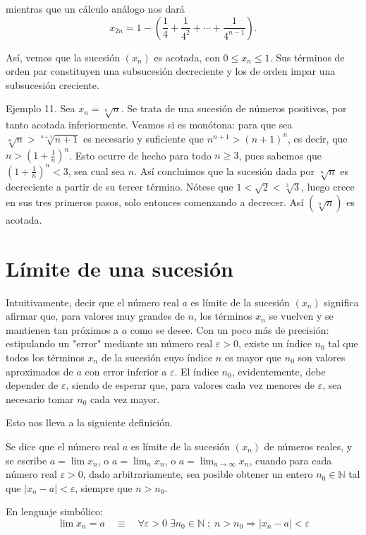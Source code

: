\documentclass[12pt,oneside]{book}
\begin{document}
mientras que un cálculo análogo nos dará
\[x_{2n} = 1 - \left(\frac{1}{4} + \frac{1}{4^2} + \cdots + \frac{1}{4^{n-1}}\right).\]

Así, vemos que la sucesión \((x_n)\) es acotada, con \(0 \le x_n \le 1\). Sus términos de orden par constituyen una subsucesión decreciente y los de orden impar una subsucesión creciente.

Ejemplo 11. Sea \(x_n = \sqrt[n]{n}\). Se trata de una sucesión de números positivos, por tanto acotada inferiormente. Veamos si es monótona: para que sea \(\sqrt[n]{n} > \sqrt[n+1]{n+1}\) es necesario y suficiente que \(n^{n+1} > (n+1)^n\), es decir, que \(n > \left(1 + \frac{1}{n}\right)^n\). Esto ocurre de hecho para todo \(n \ge 3\), pues sabemos que \(\left(1 + \frac{1}{n}\right)^n < 3\), sea cual sea \(n\). Así concluimos que la sucesión dada por \(\sqrt[n]{n}\) es decreciente a partir de su tercer término. Nótese que \(1 < \sqrt{2} < \sqrt[3]{3}\), luego crece en sus tres primeros pasos, solo entonces comenzando a decrecer. Así \((\sqrt[n]{n})\) es acotada.

\section{Límite de una sucesión}

Intuitivamente, decir que el número real \(a\) es límite de la sucesión \((x_n)\) significa afirmar que, para valores muy grandes de \(n\), los términos \(x_n\) se vuelven y se mantienen tan próximos a \(a\) como se desee. Con un poco más de precisión: estipulando un "error" mediante un número real \(\varepsilon > 0\), existe un índice \(n_0\) tal que todos los términos \(x_n\) de la sucesión cuyo índice \(n\) es mayor que \(n_0\) son valores aproximados de \(a\) con error inferior a \(\varepsilon\). El índice \(n_0\), evidentemente, debe depender de \(\varepsilon\), siendo de esperar que, para valores cada vez menores de \(\varepsilon\), sea necesario tomar \(n_0\) cada vez mayor.

Esto nos lleva a la siguiente definición.

Se dice que el número real \(a\) es límite de la sucesión \((x_n)\) de números reales, y se escribe \(a = \lim x_n\), o \(a = \lim_{n} x_n\), o \(a = \lim_{n \to \infty} x_n\), cuando para cada número real \(\varepsilon > 0\), dado arbitrariamente, sea posible obtener un entero \(n_0 \in \mathbb{N}\) tal que \(|x_n - a| < \varepsilon\), siempre que \(n > n_0\).

En lenguaje simbólico:
\[
\boxed{\lim x_n = a \quad \equiv \quad \forall \varepsilon > 0 \; \exists n_0 \in \mathbb{N} \; ; \; n > n_0 \Rightarrow |x_n - a| < \varepsilon}
\]
\end{document}
